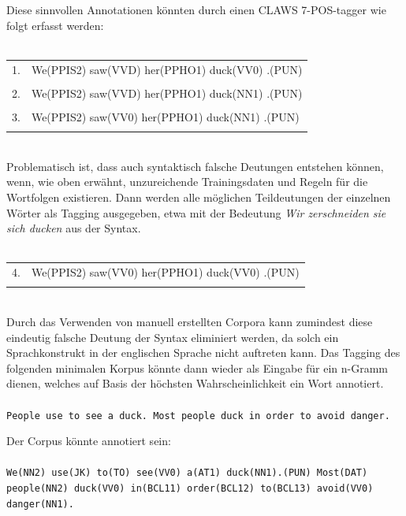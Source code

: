\documentclass[12pt]{report}
\begin{document}
Diese sinnvollen Annotationen könnten durch einen CLAWS 7-POS-tagger wie folgt erfasst werden:
\\ \tt
\begin{tabular}{ll} 
\\
1. & We(PPIS2) saw(VVD) her(PPHO1) duck(VV0) .(PUN) \\
\\
2. & We(PPIS2) saw(VVD) her(PPHO1) duck(NN1) .(PUN) \\
\\
3. & We(PPIS2) saw(VV0) her(PPHO1) duck(NN1) .(PUN) \\
\\
\end{tabular} 
\\ \rm
Problematisch ist, dass auch syntaktisch falsche Deutungen entstehen können, wenn, wie oben erwähnt, unzureichende Trainingsdaten und Regeln für die Wortfolgen existieren. Dann werden alle möglichen Teildeutungen der einzelnen Wörter als Tagging ausgegeben, etwa mit der Bedeutung \textit{\glqq  Wir zerschneiden sie sich ducken\grqq{}} aus der Syntax.
\\ \tt
\begin{tabular}{ll} 
\\
4. & We(PPIS2) saw(VV0) her(PPHO1) duck(VV0) .(PUN)\\
\\
\end{tabular} 
\\ \rm
Durch das Verwenden von manuell erstellten Corpora kann zumindest diese eindeutig falsche Deutung der Syntax eliminiert werden, da solch ein Sprachkonstrukt in der englischen Sprache nicht auftreten kann. Das Tagging des folgenden minimalen Korpus könnte dann wieder als Eingabe für ein n-Gramm dienen, welches auf Basis der höchsten Wahrscheinlichkeit ein Wort annotiert.
\\ \tt
\\
People use to see a duck. Most people duck in order to avoid danger.
\rm

Der Corpus könnte annotiert sein:
\\ \tt
\\
We(NN2) use(JK) to(TO) see(VV0) a(AT1) duck(NN1).(PUN) Most(DAT) people(NN2) duck(VV0) in(BCL11) order(BCL12) to(BCL13) avoid(VV0) danger(NN1).
\\ \rm
\end{document}
